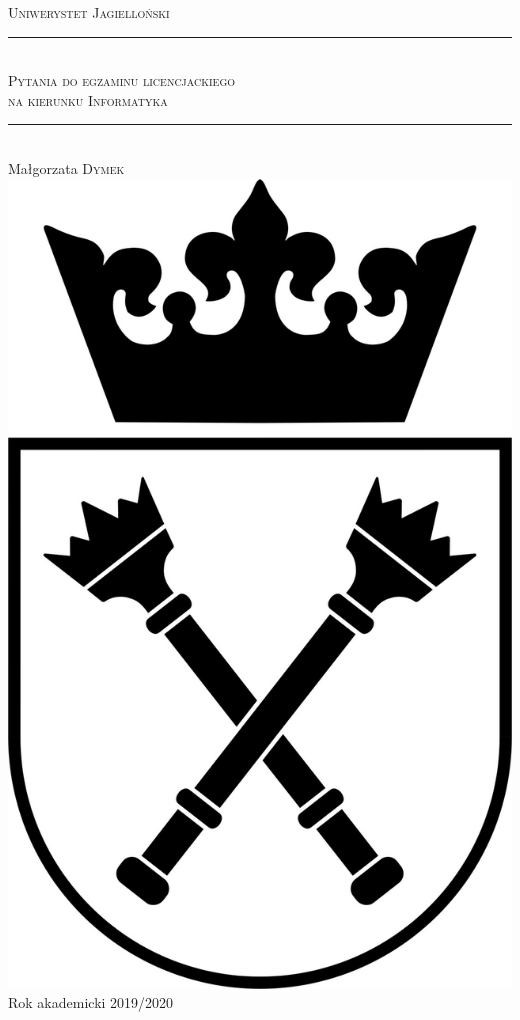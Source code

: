 \documentclass[12pt]{article}
\begin{document}
    \begin{titlepage}

        \newcommand{\HRule}{\rule{\linewidth}{0.5mm}}

        \center

        \textsc{\LARGE Uniwerystet Jagielloński}\\[1.5cm]

        \HRule \\[0.4cm]
        \textsc{\Large Pytania do egzaminu licencjackiego}\\[0.5cm]
        \textsc{\large na kierunku Informatyka}\\[0.5cm]
        \HRule \\[1.0cm]

        \Large%
        Małgorzata \textsc{Dymek}\\[1.5cm]

        \includegraphics[scale=0.27]{uj.jpg}\\[4cm]

        {\large Rok akademicki 2019/2020}\\

        \vfill
    \end{titlepage}
\end{document}
